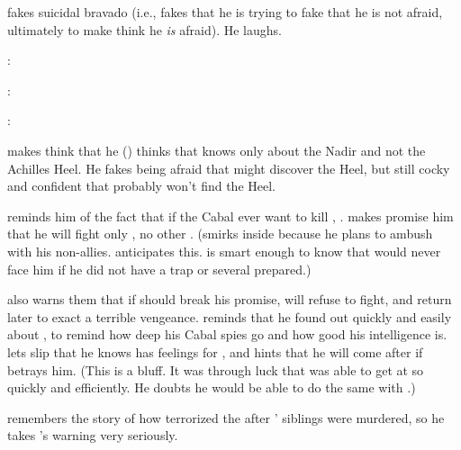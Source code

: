 \Ishnaruchaefir{} fakes suicidal bravado (i.e., fakes that he is trying to fake that he is not afraid, ultimately to make \Teshrial{} think he \emph{is} afraid).
He laughs.

\begin{prose}
  \Ishnaruchaefir: 
  
  \Teshrial:
  
  \Ishnaruchaefir:
\end{prose}

\Ishnaruchaefir{} makes \Teshrial{} think that he (\Ishnaruchaefir) thinks that \Teshrial{} knows only about the Nadir and not the Achilles Heel. 
He fakes being afraid that \Teshrial{} might discover the Heel, but still cocky and confident that \Teshrial{} probably won't find the Heel. 

\Ishnaruchaefir reminds him of the fact that if the Cabal ever want to kill \Ishnaruchaefir, . 
\Ishnaruchaefir makes \Teshrial promise him that he will fight only \Teshrial, no other \resphain. 
(\Teshrial smirks inside because he plans to ambush \Ishnaruchaefir with his non-\resphan allies. \Ishnaruchaefir anticipates this. \Ishnaruchaefir is smart enough to know that \Teshrial would never face him if he did not have a trap or several prepared.)

\Ishnaruchaefir also warns them that if \Teshrial should break his promise, \Ishnaruchaefir will refuse to fight, and return later to exact a terrible vengeance.
\Ishnaruchaefir reminds \Teshrial that he found out quickly and easily about \Urizeth, to remind \Teshrial how deep his Cabal spies go and how good his intelligence is.
\Ishnaruchaefir lets slip that he knows \Teshrial has feelings for \Firaxel, and hints that he will come after \Firaxel if \Teshrial betrays him. 
(This is a bluff. It was through luck that \Ishnaruchaefir was able to get at \Urizeth so quickly and efficiently. He doubts he would be able to do the same with \Firaxel.)

\Teshrial remembers the story of how \Ishnaruchaefir terrorized the \resphain after \Criseis' siblings were murdered, so he takes \Ishnaruchaefir's warning very seriously.








